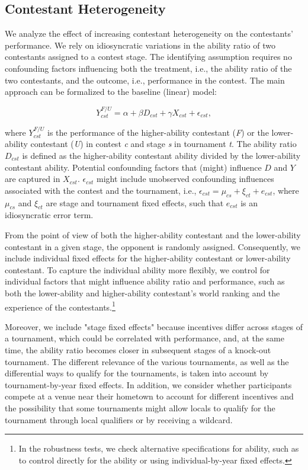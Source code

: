 \documentclass[11pt,a4paper]{article}
\begin{document}
\subsection{Contestant Heterogeneity}
We analyze the effect of increasing contestant heterogeneity on the contestants' performance. We rely on idiosyncratic variations in the ability ratio of two contestants assigned to a contest stage. The identifying assumption requires no confounding factors influencing both the treatment, i.e., the ability ratio of the two contestants, and the outcome, i.e., performance in the contest. The main approach can be formalized to the baseline (linear) model:

\begin{equation*}
    Y_{cst}^{F/U} = \alpha + \beta D_{cst} + \gamma X_{cst} + \epsilon_{cst},
\end{equation*}

\noindent
where $Y_{cst}^{F/U}$ is the performance of the higher-ability contestant (\textit{F}) or the lower-ability contestant (\textit{U}) in contest \textit{c} and stage \textit{s} in tournament \textit{t}. The ability ratio $D_{cst}$ is defined as the higher-ability contestant ability divided by the lower-ability contestant ability. Potential confounding factors that (might) influence $D$ and $Y$ are captured in $X_{cst}$. $\epsilon_{cst}$ might include unobserved confounding influences associated with the contest and the tournament, i.e., $\epsilon_{cst} = \mu_{cs} + \xi_{ct} + e_{cst}$, where $\mu_{cs}$ and $\xi_{ct}$ are stage and tournament fixed effects, such that $e_{cst}$ is an idiosyncratic error term.\par

From the point of view of both the higher-ability contestant and the lower-ability contestant in a given stage, the opponent is randomly assigned. Consequently, we include individual fixed effects for the higher-ability contestant or lower-ability contestant. To capture the individual ability more flexibly, we control for individual factors that might influence ability ratio and performance, such as both the lower-ability and higher-ability contestant's world ranking and the experience of the contestants.\footnote{In the robustness tests, we check alternative specifications for ability, such as to control directly for the ability or using individual-by-year fixed effects.}\par

Moreover, we include "stage fixed effects" because incentives differ across stages of a tournament, which could be correlated with performance, and, at the same time, the ability ratio becomes closer in subsequent stages of a knock-out tournament. The different relevance of the various tournaments, as well as the differential ways to qualify for the tournaments, is taken into account by tournament-by-year fixed effects. In addition, we consider whether participants compete at a venue near their hometown to account for different incentives and the possibility that some tournaments might allow locals to qualify for the tournament through local qualifiers or by receiving a wildcard.\par
\end{document}

